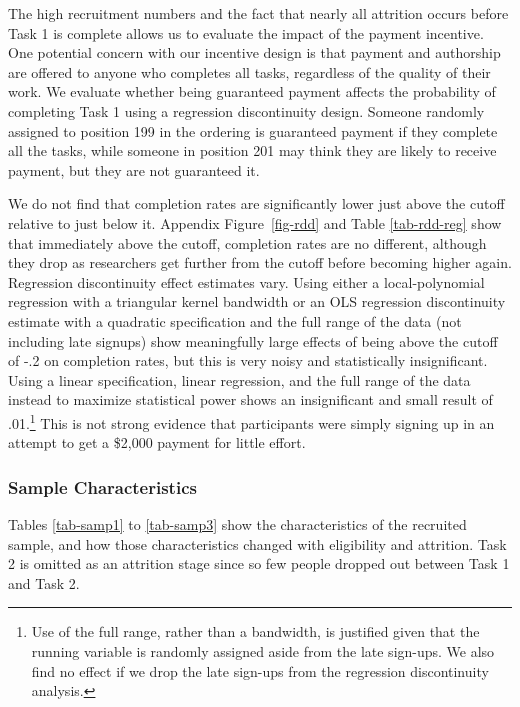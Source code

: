 \documentclass[
  letterpaper,
  DIV=11,
  numbers=noendperiod]{scrartcl}
\begin{document}
The high recruitment numbers and the fact that nearly all attrition
occurs before Task 1 is complete allows us to evaluate the impact of the
payment incentive. One potential concern with our incentive design is
that payment and authorship are offered to anyone who completes all
tasks, regardless of the quality of their work. We evaluate whether
being guaranteed payment affects the probability of completing Task 1
using a regression discontinuity design. Someone randomly assigned to
position 199 in the ordering is guaranteed payment if they complete all
the tasks, while someone in position 201 may think they are likely to
receive payment, but they are not guaranteed it.

We do not find that completion rates are significantly lower just above
the cutoff relative to just below it. Appendix Figure~\ref{fig-rdd} and
Table \ref{tab-rdd-reg} show that immediately above the cutoff,
completion rates are no different, although they drop as researchers get
further from the cutoff before becoming higher again. Regression
discontinuity effect estimates vary. Using either a local-polynomial
regression with a triangular kernel bandwidth or an OLS regression
discontinuity estimate with a quadratic specification and the full range
of the data (not including late signups) show meaningfully large effects
of being above the cutoff of -.2 on completion rates, but this is very
noisy and statistically insignificant. Using a linear specification,
linear regression, and the full range of the data instead to maximize
statistical power shows an insignificant and small result of
.01.\footnote{Use of the full range, rather than a bandwidth, is
  justified given that the running variable is randomly assigned aside
  from the late sign-ups. We also find no effect if we drop the late
  sign-ups from the regression discontinuity analysis.} This is not
strong evidence that participants were simply signing up in an attempt
to get a \$2,000 payment for little effort.

\hypertarget{sec-sample-characteristics}{%
\subsubsection{Sample
Characteristics}\label{sec-sample-characteristics}}

Tables \ref{tab-samp1} to \ref{tab-samp3} show the characteristics of
the recruited sample, and how those characteristics changed with
eligibility and attrition. Task 2 is omitted as an attrition stage since
so few people dropped out between Task 1 and Task 2.
\end{document}
